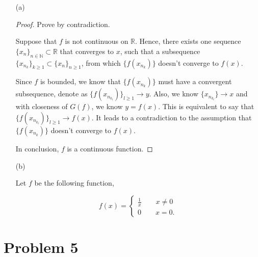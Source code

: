 \documentclass[12pt]{article}
\begin{document}
\begin{enumerate}

\item [(a)]

\begin{proof}
Prove by contradiction.

Suppose that $f$ is not continuous on $\mathbb R$. Hence, there exists one sequence $\{x_n\}_{n\in\mathbb N}\subset \mathbb R$ that converges to $x$, such that a subsequence $\{x_{n_k}\}_{k\geqslant 1} \subset \{x_n\}_{n\geqslant 1}$, from which $\{f(x_{n_k})\}$ doesn't converge to $f(x)$. 

Since $f$ is bounded, we know that $\{f(x_{n_k})\}$ must have a convergent subsequence, denote as $\{f(x_{n_{k_l}})\}_{l\geqslant 1} \rightarrow y$. Also, we know $\{x_{n_{k_l}}\} \rightarrow x$ and with closeness of $G(f)$, we know $y = f(x)$. This is equivalent to say that  $\{f(x_{n_{k_l}})\}_{l\geqslant 1} \rightarrow f(x)$. It leads to a contradiction to the assumption that $\{f(x_{n_k})\}$ doesn't converge to $f(x)$.

In conclusion, $f$ is a continuous function.

\end{proof}

\item [(b)]

Let $f$ be the following function,

$$
f(x) = \left\{
\begin{aligned}
\frac{1}{x}\qquad x \neq 0\\
0 \qquad x = 0.
\end{aligned}
\right.
$$

\end{enumerate}



\section*{Problem 5}
\end{document}
